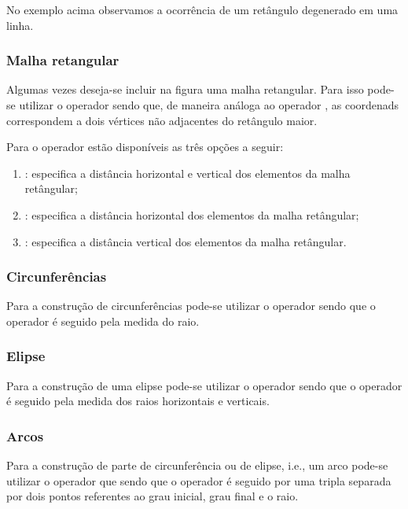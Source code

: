 No exemplo acima observamos a ocorrência de um retângulo degenerado em uma linha.

\subsubsection{Malha retangular}
Algumas vezes deseja-se incluir na figura uma malha retangular. Para isso pode-se utilizar o operador  sendo que, de maneira análoga ao operador , as coordenads correspondem a dois vértices não adjacentes do retângulo maior. \\

Para o operador  estão disponíveis as três opções a seguir:
\begin{enumerate}
    \item {}: especifica a distância horizontal e vertical dos elementos da malha retângular;
    \item {}: especifica a distância horizontal dos elementos da malha retângular;
    \item {}: especifica a distância vertical dos elementos da malha retângular.
\end{enumerate}

\subsubsection{Circunferências}
Para a construção de circunferências pode-se utilizar o operador  sendo que o operador é seguido pela medida do raio. \\

\subsubsection{Elipse}
Para a construção de uma elipse pode-se utilizar o operador  sendo que o operador é seguido pela medida dos raios horizontais e verticais. \\

\subsubsection{Arcos}
Para a construção de parte de circunferência ou de elipse, i.e., um arco pode-se utilizar o operador  que sendo que o operador é seguido por uma tripla separada por dois pontos referentes ao grau inicial, grau final e o raio. \\

